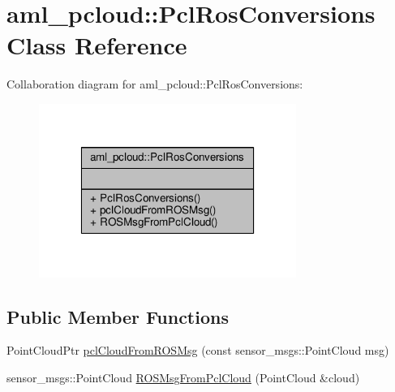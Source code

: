 \hypertarget{classaml__pcloud_1_1_pcl_ros_conversions}{\section{aml\-\_\-pcloud\-:\-:Pcl\-Ros\-Conversions Class Reference}
\label{classaml__pcloud_1_1_pcl_ros_conversions}
}


Collaboration diagram for aml\-\_\-pcloud\-:\-:Pcl\-Ros\-Conversions\-:
\nopagebreak
\begin{figure}[H]
\begin{center}
\leavevmode
\includegraphics[width=238pt]{classaml__pcloud_1_1_pcl_ros_conversions__coll__graph}
\end{center}
\end{figure}
\subsection*{Public Member Functions}
\begin{DoxyCompactItemize}
\item 
Point\-Cloud\-Ptr \hyperlink{classaml__pcloud_1_1_pcl_ros_conversions_abb5eb6a16b3259bcf114d6634fb9134d}{pcl\-Cloud\-From\-R\-O\-S\-Msg} (const sensor\-\_\-msgs\-::\-Point\-Cloud msg)
\item 
sensor\-\_\-msgs\-::\-Point\-Cloud \hyperlink{classaml__pcloud_1_1_pcl_ros_conversions_aee8712801504c12707500027abb5915e}{R\-O\-S\-Msg\-From\-Pcl\-Cloud} (Point\-Cloud \&cloud)
\end{DoxyCompactItemize}


